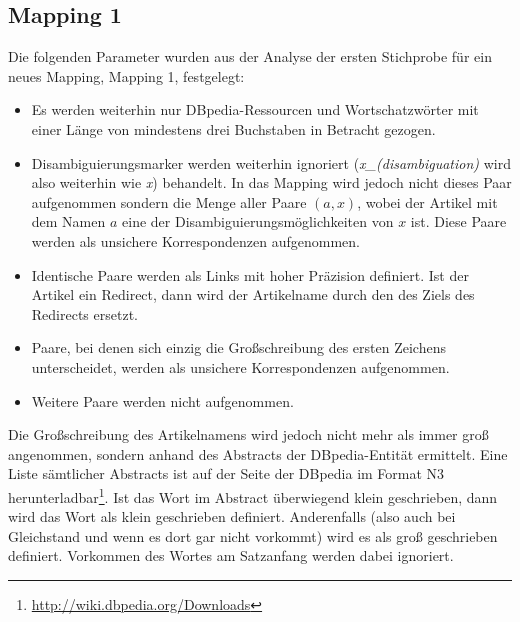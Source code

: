 \subsection{Mapping 1}\label{sec:mapping1}
Die folgenden Parameter wurden aus der Analyse der ersten Stichprobe für ein neues Mapping, Mapping 1, festgelegt:
\begin{itemize}
\item Es werden weiterhin nur DBpedia-Ressourcen und Wortschatzwörter mit einer Länge von mindestens drei Buchstaben in Betracht gezogen.\footnotemark
{}
\item Disambiguierungsmarker werden weiterhin ignoriert (\emph{x\_(disambiguation)} wird also weiterhin wie \emph{x}) behandelt. In das Mapping wird jedoch nicht dieses Paar aufgenommen sondern
die Menge aller Paare $(a,x)$, wobei der Artikel mit dem Namen $a$ eine der Disambiguierungsmöglichkeiten von $x$ ist. Diese Paare werden als unsichere Korrespondenzen aufgenommen.
\item Identische Paare werden als Links mit hoher Präzision definiert. Ist der Artikel ein Redirect, dann wird der Artikelname durch den des Ziels des Redirects ersetzt.
\item Paare, bei denen sich einzig die Großschreibung des ersten Zeichens unterscheidet, werden als unsichere Korrespondenzen aufgenommen.
\item Weitere Paare werden nicht aufgenommen.\footnotemark
{}
\end{itemize}
Die Großschreibung des Artikelnamens wird jedoch nicht mehr als immer groß angenommen, sondern anhand des Abstracts der DBpedia-Entität ermittelt.
Eine Liste sämtlicher Abstracts ist auf der Seite der DBpedia im Format N3 herunterladbar\footnote{\url{http://wiki.dbpedia.org/Downloads}}.
Ist das Wort im Abstract überwiegend klein geschrieben, dann wird das Wort als klein geschrieben definiert.
Anderenfalls (also auch bei Gleichstand und wenn es dort gar nicht vorkommt) wird es als groß geschrieben definiert.
Vorkommen des Wortes am Satzanfang werden dabei ignoriert.

\iffalse
